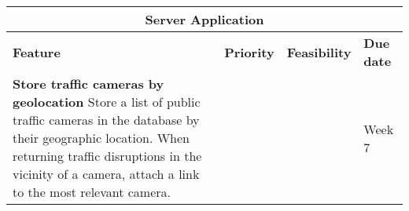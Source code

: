 \begin{center}
\begin{tabular}{ | p{9cm} | c | c | p{1.8cm} | }
\hline
\multicolumn{4}{|c|}{\textbf{Server Application}} \\ \hline
\textbf{Feature} & \textbf{Priority} & \textbf{Feasibility} & \textbf{Due date}
\\ \hline
\textbf{Store traffic cameras by geolocation}\newline
Store a list of public traffic cameras in the database by their geographic
location. When returning traffic disruptions in the vicinity of a camera,
attach a link to the most relevant camera. &  &  & Week 7 \\ \hline
\end{tabular}
\end{center}
